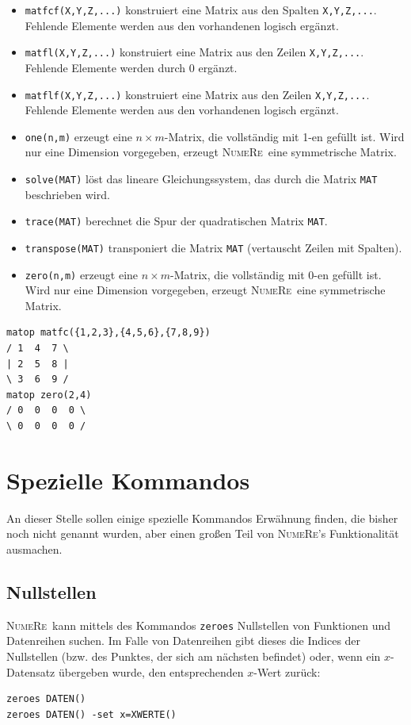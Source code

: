 \documentclass[DIV=14,headsepline,footsepline]{scrbook}
\newcommand{\NR}{\textsc{Nu\-me\-Re}}
\begin{document}
\begin{itemize}
					\item \verb+matfcf(X,Y,Z,...)+ konstruiert eine Matrix aus den Spalten \verb+X,Y,Z,...+. Fehlende Elemente werden aus den vorhandenen logisch ergänzt.
					\item \verb+matfl(X,Y,Z,...)+ konstruiert eine Matrix aus den Zeilen \verb+X,Y,Z,...+. Fehlende Elemente werden durch 0 ergänzt.
					\item \verb+matflf(X,Y,Z,...)+ konstruiert eine Matrix aus den Zeilen \verb+X,Y,Z,...+. Fehlende Elemente werden aus den vorhandenen logisch ergänzt.
					\item \verb+one(n,m)+ erzeugt eine $n\times m$-Matrix, die vollständig mit 1-en gefüllt ist. Wird nur eine Dimension vorgegeben, erzeugt \NR\ eine symmetrische Matrix.
					\item \verb+solve(MAT)+ löst das lineare Gleichungssystem, das durch die Matrix \verb+MAT+ beschrieben wird.
					\item \verb+trace(MAT)+ berechnet die Spur der quadratischen Matrix \verb+MAT+.
					\item \verb+transpose(MAT)+ transponiert die Matrix \verb+MAT+ (vertauscht Zeilen mit Spalten).
					\item \verb+zero(n,m)+ erzeugt eine $n\times m$-Matrix, die vollständig mit 0-en gefüllt ist. Wird nur eine Dimension vorgegeben, erzeugt \NR\ eine symmetrische Matrix.
				\end{itemize}
				\begin{lstlisting}
matop matfc({1,2,3},{4,5,6},{7,8,9})
/ 1  4  7 \
| 2  5  8 |
\ 3  6  9 /
matop zero(2,4)
/ 0  0  0  0 \
\ 0  0  0  0 /
				\end{lstlisting}
		\chapter{Spezielle Kommandos}
			An dieser Stelle sollen einige spezielle Kommandos Erwähnung finden, die bisher noch nicht genannt wurden, aber einen großen Teil von \NR's Funktionalität ausmachen.
			\section{Nullstellen}
				\NR\ kann mittels des Kommandos \verb+zeroes+\cmd{zeroes} Nullstellen von Funktionen und Datenreihen suchen. Im Falle von Datenreihen gibt dieses die Indices der Nullstellen (bzw. des Punktes, der sich am nächsten befindet) oder, wenn ein $x$-Datensatz übergeben wurde, den entsprechenden $x$-Wert zurück:
				\begin{lstlisting}
zeroes DATEN()
zeroes DATEN() -set x=XWERTE()
				\end{lstlisting}
				
\end{document}
